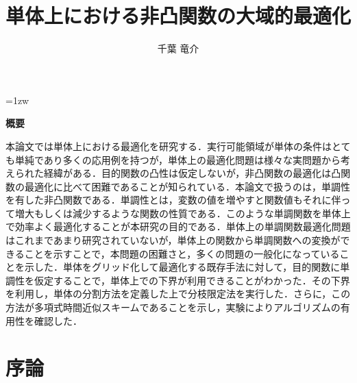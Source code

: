 \documentclass[a4paper,11pt]{jreport}
\title{単体上における非凸関数の大域的最適化}
\author{千葉 竜介}
\begin{document}
\maketitle
\thispagestyle{empty}
\newpage

\thispagestyle{empty}
\vspace*{20pt plus 1fil}
\parindent=1zw
\noindent
\begin{center}
{\bf 概要}
\vspace{5mm}
\end{center}

本論文では単体上における最適化を研究する．実行可能領域が単体の条件はとても単純であり多くの応用例を持つが，単体上の最適化問題は様々な実問題から考えられた経緯がある．目的関数の凸性は仮定しないが，非凸関数の最適化は凸関数の最適化に比べて困難であることが知られている．本論文で扱うのは，単調性を有した非凸関数である．単調性とは，変数の値を増やすと関数値もそれに伴って増大もしくは減少するような関数の性質である．このような単調関数を単体上で効率よく最適化することが本研究の目的である．単体上の単調関数最適化問題はこれまであまり研究されていないが，単体上の関数から単調関数への変換ができることを示すことで，本問題の困難さと，多くの問題の一般化になっていることを示した．単体をグリッド化して最適化する既存手法に対して，目的関数に単調性を仮定することで，単体上での下界が利用できることがわかった．その下界を利用し，単体の分割方法を定義した上で分枝限定法を実行した．さらに，この方法が多項式時間近似スキームであることを示し，実験によりアルゴリズムの有用性を確認した．

\par
\vspace{0pt plus 1fil}
\newpage

\tableofcontents
\listoffigures
\listoftables

\pagebreak
\setcounter{page}{1}

\chapter{序論}
\end{document}
